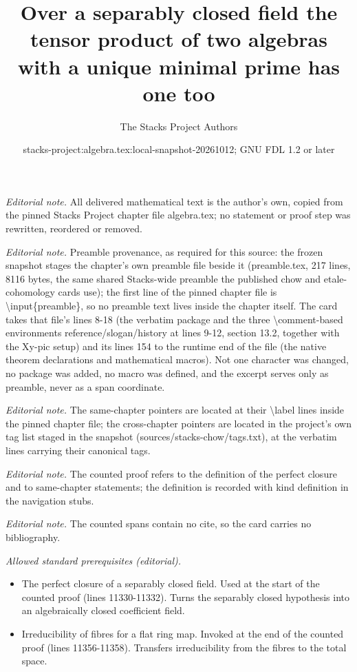 \documentclass[10pt,a4paper]{amsart}
\title{Over a separably closed field the tensor product of two algebras with a unique minimal prime has one too}
\author{The Stacks Project Authors}
\date{stacks-project:algebra.tex:local-snapshot-20261012; GNU FDL 1.2 or later}
\theoremstyle{plain}
\theoremstyle{definition}
\theoremstyle{remark}
\numberwithin{equation}{subsection}
\begin{document}
\maketitle
\noindent\textit{Editorial note.} All delivered mathematical text is the author's own, copied from the pinned Stacks Project chapter file algebra.tex; no statement or proof step was rewritten, reordered or removed.\par\medskip
\noindent\textit{Editorial note.} Preamble provenance, as required for this source: the frozen snapshot stages the chapter's own preamble file beside it (preamble.tex, 217 lines, 8116 bytes, the same shared Stacks-wide preamble the published chow and etale-cohomology cards use); the first line of the pinned chapter file is \textbackslash{}input\{preamble\}, so no preamble text lives inside the chapter itself. The card takes that file's lines 8-18 (the verbatim package and the three \textbackslash{}comment-based environments reference/slogan/history at lines 9-12, section 13.2, together with the Xy-pic setup) and its lines 154 to the runtime end of the file (the native theorem declarations and mathematical macros). Not one character was changed, no package was added, no macro was defined, and the excerpt serves only as preamble, never as a span coordinate.\par\medskip
\noindent\textit{Editorial note.} The same-chapter pointers are located at their \textbackslash{}label lines inside the pinned chapter file; the cross-chapter pointers are located in the project's own tag list staged in the snapshot (sources/stacks-chow/tags.txt), at the verbatim lines carrying their canonical tags.\par\medskip
\noindent\textit{Editorial note.} The counted proof refers to the definition of the perfect closure and to same-chapter statements; the definition is recorded with kind definition in the navigation stubs.\par\medskip
\noindent\textit{Editorial note.} The counted spans contain no cite, so the card carries no bibliography.\par\medskip
\noindent\textit{Allowed standard prerequisites (editorial).}\begin{itemize}
\item The perfect closure of a separably closed field. Used at the start of the counted proof (lines 11330-11332). Turns the separably closed hypothesis into an algebraically closed coefficient field.
\item Irreducibility of fibres for a flat ring map. Invoked at the end of the counted proof (lines 11356-11358). Transfers irreducibility from the fibres to the total space.
\end{itemize}\medskip
\end{document}
